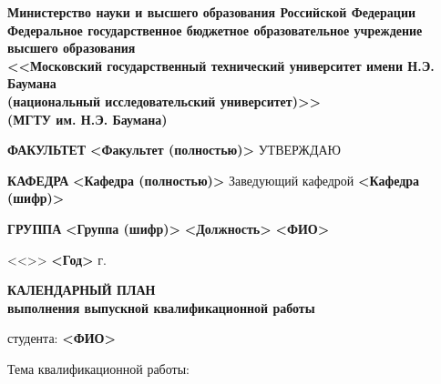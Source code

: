 \documentclass[utf8x, 14pt, oneside, a4paper]{article}
\begin{document}
	\thispagestyle{empty}

	\begin{center}
		\fontsize{12pt}{0.3\baselineskip}\selectfont \textbf{Министерство науки и высшего образования Российской Федерации \\ Федеральное государственное бюджетное образовательное учреждение \\ высшего образования \\ <<Московский государственный технический университет имени Н.Э. Баумана \\ (национальный исследовательский университет)>> \\ (МГТУ им. Н.Э. Баумана)}

		\fontsize{12pt}{0.5\baselineskip}\selectfont
		\noindent \makebox[\linewidth]{\rule{\textwidth}{4pt}} \makebox[\linewidth]{\rule{\textwidth}{1pt}}
	\end{center}

	\begin{flushleft}
		\fontsize{12pt}{\baselineskip}\selectfont \textbf{ФАКУЛЬТЕТ} \textbf{<Факультет (полностью)>} \hfill УТВЕРЖДАЮ

		\textbf{КАФЕДРА} \hspace{4.6mm} \textbf{<Кафедра (полностью)>} \hfill Заведующий кафедрой \textbf{<Кафедра (шифр)>}

		\textbf{ГРУППА} \hspace{7mm} \textbf{<Группа (шифр)>} \hfill \textbf{<Должность>} \uline{\hspace*{2cm}} \textbf{<ФИО>}

		\hfill <<\uline{\hspace*{1cm}}>> \uline{\hspace*{2.5cm}} \textbf{<Год>} г.
	\end{flushleft}

	\begin{center}
		\normalsize

		\textbf{КАЛЕНДАРНЫЙ ПЛАН \\ выполнения выпускной квалификационной работы}

		студента: \textbf{<ФИО>}
	\end{center}

	\begin{flushleft}
		\fontsize{12pt}{\baselineskip}\selectfont Тема квалификационной работы: \uline{\hfill} \\ \uline{\hfill}
	\end{flushleft}
\end{document}
